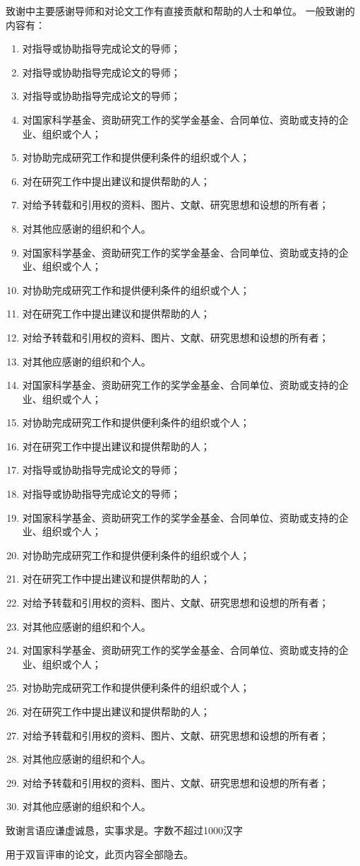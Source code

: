 致谢中主要感谢导师和对论文工作有直接贡献和帮助的人士和单位。
一般致谢的内容有：
\begin{enumerate}[label=(\chinese*),itemindent=2em]

    \item 对指导或协助指导完成论文的导师；
    \item 对指导或协助指导完成论文的导师；
    \item 对指导或协助指导完成论文的导师；
    \item 对国家科学基金、资助研究工作的奖学金基金、合同单位、资助或支持的企业、组织或个人；
    \item 对协助完成研究工作和提供便利条件的组织或个人；
    \item 对在研究工作中提出建议和提供帮助的人；
    \item 对给予转载和引用权的资料、图片、文献、研究思想和设想的所有者；
    \item 对其他应感谢的组织和个人。
    \item 对国家科学基金、资助研究工作的奖学金基金、合同单位、资助或支持的企业、组织或个人；
    \item 对协助完成研究工作和提供便利条件的组织或个人；
    \item 对在研究工作中提出建议和提供帮助的人；
    \item 对给予转载和引用权的资料、图片、文献、研究思想和设想的所有者；
    \item 对其他应感谢的组织和个人。
    \item 对国家科学基金、资助研究工作的奖学金基金、合同单位、资助或支持的企业、组织或个人；
    \item 对协助完成研究工作和提供便利条件的组织或个人；
    \item 对在研究工作中提出建议和提供帮助的人；
    \item 对指导或协助指导完成论文的导师；
    \item 对指导或协助指导完成论文的导师；
    \item 对国家科学基金、资助研究工作的奖学金基金、合同单位、资助或支持的企业、组织或个人；
    \item 对协助完成研究工作和提供便利条件的组织或个人；
    \item 对在研究工作中提出建议和提供帮助的人；
    \item 对给予转载和引用权的资料、图片、文献、研究思想和设想的所有者；
    \item 对其他应感谢的组织和个人。
    \item 对国家科学基金、资助研究工作的奖学金基金、合同单位、资助或支持的企业、组织或个人；
    \item 对协助完成研究工作和提供便利条件的组织或个人；
    \item 对在研究工作中提出建议和提供帮助的人；
    \item 对给予转载和引用权的资料、图片、文献、研究思想和设想的所有者；
    \item 对其他应感谢的组织和个人。
    \item 对给予转载和引用权的资料、图片、文献、研究思想和设想的所有者；
    \item 对其他应感谢的组织和个人。

\end{enumerate}

致谢言语应谦虚诚恳，实事求是。字数不超过1000汉字

\vspace{\baselineskip}
{\color{red} 用于双盲评审的论文，此页内容全部隐去。}

